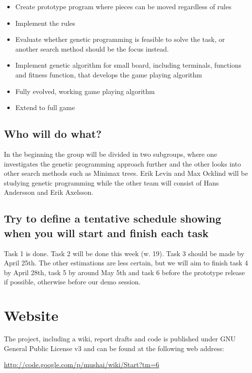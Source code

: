 \documentclass[times, 10pt,twocolumn]{article}
\begin{document}
\begin{itemize}
	\item{Create prototype program where pieces can be moved regardless of rules}
	\item{Implement the rules}
	\item{Evaluate whether genetic programming is feasible to solve the task, or another search method should be the focus instead.}
	\item{Implement genetic algorithm for small board, including terminals, functions and fitness function, that develops the game playing algorithm}
	\item{Fully evolved, working game playing algorithm}
	\item{Extend to full game}
\end{itemize}

\subsection{Who will do what?}

In the beginning the group will be divided in two subgroups, where one investigates the genetic programming approach further and the other looks into other search methods such as Minimax trees. Erik Levin and Max Ocklind will be studying genetic programming while the other team will consist of Hans Andersson and Erik Axelsson.

\subsection{Try to define a tentative schedule showing when you will start and finish each task}

Task 1 is done. Task 2 will be done this week (w. 19). Task 3 should be made by April 25th. The other estimations are less certain, but we will aim to finish task 4 by April 28th, task 5 by around May 5th and task 6 before the prototype release if possible, otherwise before our demo session.

\section{Website}
The project, including a wiki, report drafts and code is published under GNU General Public License v3 and can be found at the following web address:

\url{http://code.google.com/p/mushai/wiki/Start?tm=6}

\nocite{games_solved, course_book}


\end{document}

